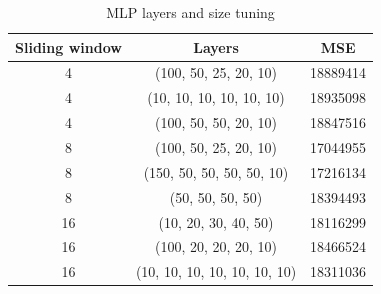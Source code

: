 \documentclass[12pt]{article}
\begin{document}
  \begin{table}[h!]
    \begin{center}
      \caption{MLP layers and size tuning}
      \label{tab:layers}
      \begin{tabular}{c|c|c}
        \textbf{Sliding window} & \textbf{Layers} & \textbf{MSE}\\
        \hline
        4 & (100, 50, 25, 20, 10) & 18889414\\
        4 & (10, 10, 10, 10, 10, 10) & 18935098\\
        4 & (100, 50, 50, 20, 10) & 18847516\\
        8 & (100, 50, 25, 20, 10) & 17044955\\
        8 & (150, 50, 50, 50, 50, 10) & 17216134\\
        8 & (50, 50, 50, 50) & 18394493\\
        16 & (10, 20, 30, 40, 50) & 18116299\\
        16 & (100, 20, 20, 20, 10) & 18466524\\
        16 & (10, 10, 10, 10, 10, 10, 10) & 18311036\\
      \end{tabular}
    \end{center}
  \end{table}


  \newpage
  {}
  
\end{document}

